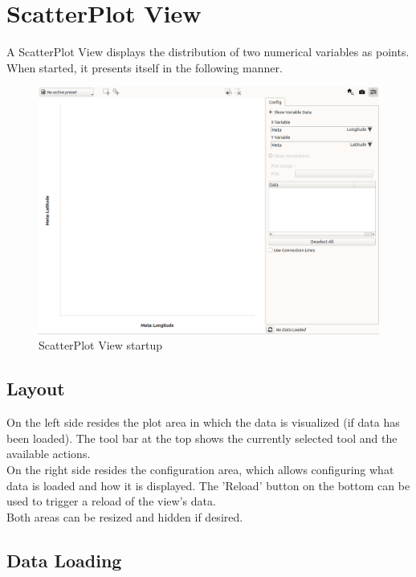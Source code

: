 \chapter{ScatterPlot View}
\label{sec:scatter_view}

A ScatterPlot View displays the distribution of two numerical variables as points. When started, it presents itself in the following manner.

\begin{figure}[H]
    \hspace*{-2cm}
    \includegraphics[width=18cm,frame]{figures/scatter_start.png}
  \caption{ScatterPlot View startup}
\end{figure}

\section{Layout}

On the left side resides the plot area in which the data is visualized (if data has been loaded). The tool bar at the top shows the currently selected tool and the available actions.\\

On the right side resides the configuration area, which allows configuring what data is loaded and how it is displayed. The 'Reload' button on the bottom can be used to trigger a reload of the view's data.\\

Both areas can be resized and hidden if desired.

\section{Data Loading}

